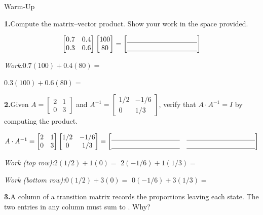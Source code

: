 \documentclass[10pt]{article}
\begin{document}
\namedateperiod

\vspace{0.15in}

\begin{notesbox}{Warm-Up}

\textbf{1.}\quad Compute the matrix--vector product. Show your work in the space provided.

\[
\begin{bmatrix}0.7 & 0.4 \\ 0.3 & 0.6\end{bmatrix}
\begin{bmatrix}100 \\ 80\end{bmatrix}
= \begin{bmatrix}\blank{3.5cm} \\ \blank{3.5cm}\end{bmatrix}
\]

\vspace{10pt}
\textit{Work:}\quad $0.7(100)+0.4(80) = $ \blank{4cm}

\vspace{6pt}
$0.3(100)+0.6(80) = $ \blank{4cm}

\vspace{18pt}
\textbf{2.}\quad Given $A = \begin{bmatrix}2&1\\0&3\end{bmatrix}$ and
$A^{-1} = \begin{bmatrix}1/2 & -1/6 \\ 0 & 1/3\end{bmatrix}$,
verify that $A \cdot A^{-1} = I$ by computing the product.

\vspace{8pt}
$A \cdot A^{-1} = \begin{bmatrix}2&1\\0&3\end{bmatrix}\begin{bmatrix}1/2&-1/6\\0&1/3\end{bmatrix}
= \begin{bmatrix}\blank{3.5cm} & \blank{3.5cm} \\ \blank{3.5cm} & \blank{3.5cm}\end{bmatrix}$

\vspace{8pt}
\textit{Work (top row):}\quad $2(1/2)+1(0) = $ \blank{2.5cm} \qquad $2(-1/6)+1(1/3) = $ \blank{2.5cm}

\vspace{6pt}
\textit{Work (bottom row):}\quad $0(1/2)+3(0) = $ \blank{2.5cm} \qquad $0(-1/6)+3(1/3) = $ \blank{2.5cm}

\vspace{18pt}
\textbf{3.}\quad A column of a transition matrix records the proportions leaving each state.
The two entries in any column must sum to \blank{2cm}. Why?

\vspace{4pt}
\writeline

\end{notesbox}
\end{document}
